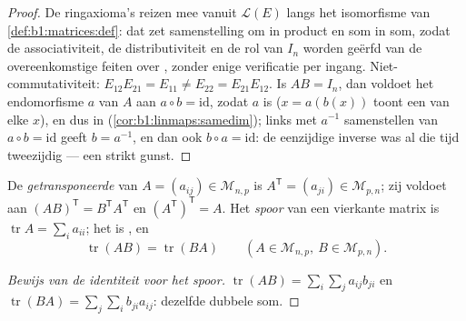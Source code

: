 \begin{proof}
De ringaxioma's reizen mee vanuit $\mathcal{L}(E)$ langs het
isomorfisme van \cref{def:b1:matrices:def}: dat zet samenstelling om
in product en som in som, zodat de associativiteit, de
distributiviteit en de rol van $I_n$ worden geërfd van de
overeenkomstige feiten over , zonder enige verificatie
per ingang. Niet-commutativiteit: $E_{12}E_{21} = E_{11} \neq E_{22}
= E_{21}E_{12}$. Is $AB = I_n$, dan voldoet het endomorfisme $a$ van
$A$ aan $a \circ b = \mathrm{id}$, zodat $a$  is ($x =
a(b(x))$ toont een  van elke $x$), en dus  in
 (\cref{cor:b1:linmaps:samedim}); links met $a^{-1}$
samenstellen van $a \circ b = \mathrm{id}$ geeft $b = a^{-1}$, en
dan ook $b\circ a = \mathrm{id}$: de eenzijdige inverse was al die
tijd tweezijdig --- een strikt  gunst.
\end{proof}

\begin{definition}\label{def:b1:matrices:transpose}
De \emph{getransponeerde} van $A = (a_{ij}) \in \mathcal{M}_{n,p}$
is $A^{\mathsf T} = (a_{ji}) \in \mathcal{M}_{p,n}$; zij voldoet aan
$(AB)^{\mathsf T} = B^{\mathsf T} A^{\mathsf T}$ en $(A^{\mathsf
T})^{\mathsf T} = A$. Het \emph{spoor} van een
vierkante matrix is $\operatorname{tr} A = \sum_i a_{ii}$; het is
, en
\[
\operatorname{tr}(AB) = \operatorname{tr}(BA)
\qquad (A \in \mathcal{M}_{n,p},\ B \in \mathcal{M}_{p,n}).
\]
\end{definition}

\begin{proof}[Bewijs van de identiteit voor het spoor]
$\operatorname{tr}(AB) = \sum_i \sum_j a_{ij} b_{ji}$ en
$\operatorname{tr}(BA) = \sum_j \sum_i b_{ji} a_{ij}$: dezelfde
dubbele som.
\end{proof}


